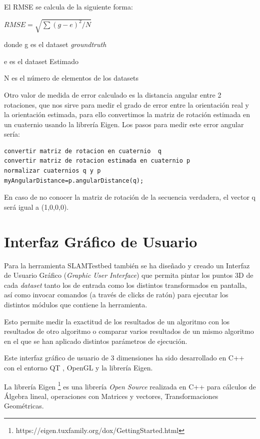 El RMSE se calcula de la siguiente forma:
\begin{center}
\begin{math}
RMSE =\sqrt{\sum{( g - e)^2}/N}
\end{math}
\end{center}

donde g es el dataset \textit{groundtruth}

      e es el dataset Estimado

      N es el número de elementos de los datasets

Otro valor de medida de error calculado es la distancia angular entre 2 rotaciones, que nos sirve para medir el grado de error entre la orientación real y la orientación estimada, para ello convertimos la matriz de rotación estimada en un cuaternio usando la librería Eigen. Los pasos para medir este error angular sería:
\begin{lstlisting}[frame=single]
convertir matriz de rotacion en cuaternio  q
convertir matriz de rotacion estimada en cuaternio p
normalizar cuaternios q y p
myAngularDistance=p.angularDistance(q);

\end{lstlisting}

En caso de no conocer la matriz de rotación de la secuencia verdadera, el vector q será igual a (1,0,0,0).








\section{Interfaz Gráfico de Usuario}
Para la herramienta SLAMTestbed también se ha diseñado y creado un Interfaz de Usuario Gráfico (\textit{Graphic User Interface}) que permita pintar los puntos 3D de cada \textit{dataset} tanto los de entrada como los distintos transformados en pantalla, así como invocar comandos (a través de clicks de ratón) para ejecutar los distintos módulos que contiene la herramienta.

Esto permite medir la exactitud de los resultados de un algoritmo con los resultados de otro algoritmo o comparar varios resultados de un mismo algoritmo en el que se han aplicado distintos parámetros de ejecución.

Este interfaz gráfico de usuario de 3 dimensiones ha sido desarrollado en C++ con el entorno QT , OpenGL y la librería Eigen. 

La librería Eigen \footnote{https://eigen.tuxfamily.org/dox/GettingStarted.html} es una librería \textit{Open Source} realizada en C++ para cálculos de Álgebra lineal, operaciones con Matrices y vectores, Transformaciones Geométricas. 

